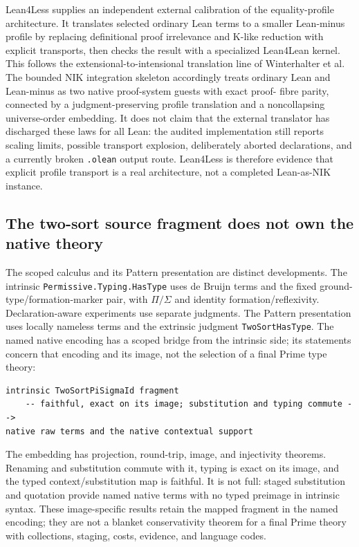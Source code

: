 \documentclass[11pt]{article}
\newcommand{\code}[1]{\texttt{#1}}
\begin{document}
Lean4Less supplies an independent external calibration of the equality-profile
architecture.  It translates selected ordinary Lean terms to a smaller
Lean-minus profile by replacing definitional proof irrelevance and K-like
reduction with explicit transports, then checks the result with a specialized
Lean4Lean kernel.  This follows the extensional-to-intensional translation line
of Winterhalter et al.  The bounded NIK integration skeleton accordingly treats
ordinary Lean and Lean-minus as two native proof-system guests with exact proof-
fibre parity, connected by a judgment-preserving profile translation and a
noncollapsing universe-order embedding.  It does not claim that the external
translator has discharged these laws for all Lean: the audited implementation
still reports scaling limits, possible transport explosion, deliberately aborted
declarations, and a currently broken \code{.olean} output route.  Lean4Less is
therefore evidence that explicit profile transport is a real architecture, not a
completed Lean-as-NIK instance.

\subsection{The two-sort source fragment does not own the native theory}

The scoped calculus and its Pattern presentation are distinct developments.
The intrinsic \code{Permissive.Typing.HasType} uses de Bruijn terms and the
fixed ground-type/formation-marker pair, with $\Pi/\Sigma$ and identity
formation/reflexivity. Declaration-aware experiments use separate judgments.
The Pattern presentation uses locally nameless terms and the extrinsic judgment
\code{TwoSortHasType}. The named native encoding has a scoped bridge from the
intrinsic side; its statements concern that encoding and its image, not the
selection of a final Prime type theory:

\begin{lstlisting}
intrinsic TwoSortPiSigmaId fragment
    -- faithful, exact on its image; substitution and typing commute -->
native raw terms and the native contextual support
\end{lstlisting}

The embedding has projection, round-trip, image, and injectivity theorems.
Renaming and substitution commute with it, typing is exact on its image, and the
typed context/substitution map is faithful.  It is not full: staged substitution
and quotation provide named native terms with no typed preimage in intrinsic
syntax. These image-specific results retain the mapped fragment in the named
encoding; they are not a blanket conservativity theorem for a final Prime
theory with collections, staging, costs, evidence, and language codes.
\end{document}
